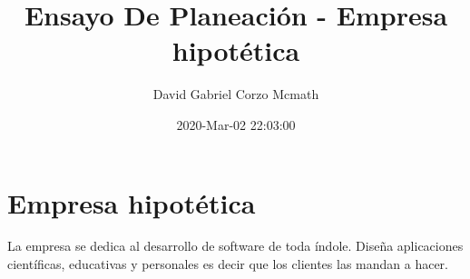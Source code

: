 \documentclass{article}
\title{Ensayo De Planeación - Empresa hipotética}
\date{2020-Mar-02 22:03:00}
\author{David Gabriel Corzo Mcmath}
\begin{document}
\maketitle


\section{Empresa hipotética}
La empresa se dedica al desarrollo de software de toda índole. Diseña aplicaciones científicas, educativas y personales es decir que los clientes las mandan a hacer.

\end{document}
